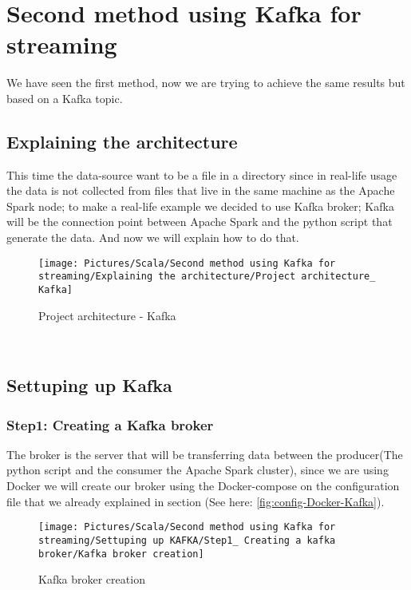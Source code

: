 \chapter{Second method using Kafka for streaming}
\par We have seen the first method, now we are trying to achieve the same results but based on a Kafka topic.
\begin{spacing}{1.2}
\section{Explaining the architecture }
\par 
This time the data-source want to be a file in a directory since in real-life usage the data is not collected from files that live in the same machine as the Apache Spark node; to make a real-life example we decided to use Kafka broker; Kafka will be the connection point between Apache Spark and the python script that generate the data. And now we will explain how to do that.
\\
\begin{figure}[!htb] 
\begin{center} 
\texttt{[image: Pictures/Scala/Second method using Kafka for streaming/Explaining the architecture/Project architecture\_ Kafka]} 
\end{center} 
\caption{Project architecture - Kafka} 
\end{figure}  \FloatBarrier
\\
\section{Settuping up Kafka }
\subsection{Step1: Creating a Kafka broker }
\par 
The broker is the server that will be transferring data between the producer(The python script and the consumer the Apache Spark cluster), since we are using Docker we will create our broker using the Docker-compose on the configuration file that we already explained in section (See here: \ref{fig:config-Docker-Kafka}).
\\
\begin{figure}[!htb] 
\begin{center} 
\texttt{[image: Pictures/Scala/Second method using Kafka for streaming/Settuping up KAFKA/Step1\_ Creating a kafka broker/Kafka broker creation]} 
\end{center} 
\caption{Kafka broker creation} 
\end{figure}  \FloatBarrier
\\

\end{spacing}
